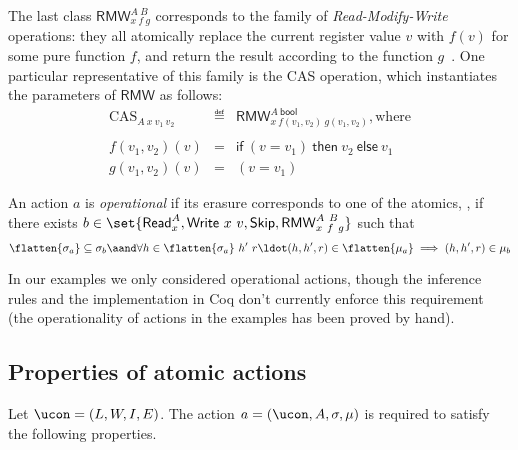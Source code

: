 The last class $\mathsf{RMW}^{A~B}_{x~f~g}$ corresponds to the family
of \emph{Read-Modify-Write} operations: they all atomically replace
the current register value $v$ with $f(v)$ for some pure function $f$,
and return the result according to the function
$g$~\cite[\S5.6]{Herlihy-Shavit:08}. One particular representative of
this family is the CAS operation, which instantiates the parameters of
$\mathsf{RMW}$ as follows:
%
{\small
\[
\begin{array}{rcl}
\text{CAS}_{A~x~v_1~v_2} & \eqdef &
\mathsf{RMW}^{A~\mathsf{bool}}_{x~f({v_1},{v_2})~g({v_1},{v_2})}, \text{where}   
\\ \\
f({v_1},{v_2})(v) & = & \mathsf{if}~ (v = v_1) ~\mathsf{then}~ v_2
~\mathsf{else}~ v_1 \\
g({v_1},{v_2})(v) & = & (v = v_1)
\end{array}
\]}

\vspace{5pt}

\begin{definition} 
\label{def:opact}
%
An action $a$ is \emph{operational} if its erasure corresponds to one
of the atomics, \ie, if there exists $b \in \set{\mathsf{Read}^A_x, \mathsf{Write}\ x\ v, \mathsf{Skip},
\mathsf{RMW}^{A~B}_{x~f~g}}$ such that
{\small
\[
\flatten{\sigma_a} \subseteq \sigma_b \aand 
\forall h \in \flatten{\sigma_a}\ h'\ r\ldot (h, h', r) \in \flatten{\mu_a} \implies (h, h', r) \in \mu_b
\]}
\end{definition}
In our examples we only considered operational actions, though the
inference rules and the implementation in Coq don't currently enforce
this requirement (the operationality of actions in the examples has
been proved by hand).

\subsection{Properties of atomic actions}
\label{sec:prop-atom-acti}

Let $\ucon = (L, W, I, {E})$. The action $a = (\ucon, A,
\sigma, \mu)$ is required to satisfy the following properties.

